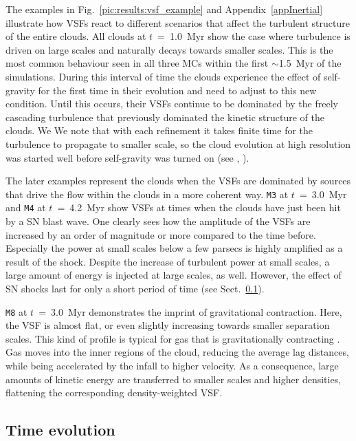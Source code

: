 \documentclass{aa}		%
\begin{document}
The examples in Fig.~\ref{pic:results:vsf_example} and Appendix~\ref{appInertial} illustrate how VSFs react to different scenarios that affect the turbulent structure of the entire clouds. 
All clouds at $t$~=~1.0~Myr show the case where turbulence is driven on large scales and naturally decays towards smaller scales.
This is the most common behaviour seen in all three MCs within the first $\sim$1.5~Myr of the simulations.
During this interval of time the clouds experience the effect of self-gravity for the first time in their evolution and need to adjust to this new condition.
Until this occurs, their VSFs continue to be dominated by the freely cascading turbulence that previously dominated the kinetic structure of the clouds.
We We note that with each refinement it takes finite time for the turbulence to propagate to smaller scale, so the cloud evolution at high resolution was started well before self-gravity was turned on (see , \citealt{Seifried2017b}).

The later examples represent the clouds when the VSFs are dominated by sources that drive the flow within the clouds in a more coherent way.
\texttt{M3} at $t$~=~3.0~Myr and \texttt{M4} at $t$~=~4.2~Myr show VSFs at times when the clouds have just been hit by a SN blast wave.
One clearly sees how the amplitude of the VSFs are increased by an order of magnitude or more compared to the time before.
Especially the power at small scales below a few parsecs is highly amplified as a result of the shock.
Despite the increase of turbulent power at small scales, a large amount of energy is injected at large scales, as well.
However, the effect of SN shocks last for only a short period of time (see Sect.~\ref{results:normal}).

\texttt{M8} at $t$~=~3.0~Myr demonstrates the imprint of gravitational contraction.
Here, the VSF is almost flat, or even slightly increasing towards smaller separation scales. 
This kind of profile is typical for gas that is gravitationally contracting \citep{Boneberg2015,Burkhart2015}.
Gas moves into the inner regions of the cloud, reducing the average lag distances, while being accelerated by the infall to higher velocity.
As a consequence, large amounts of kinetic energy are transferred to smaller scales and higher densities, flattening the corresponding density-weighted VSF.

\subsection{Time evolution}\label{results:normal}
\end{document}
